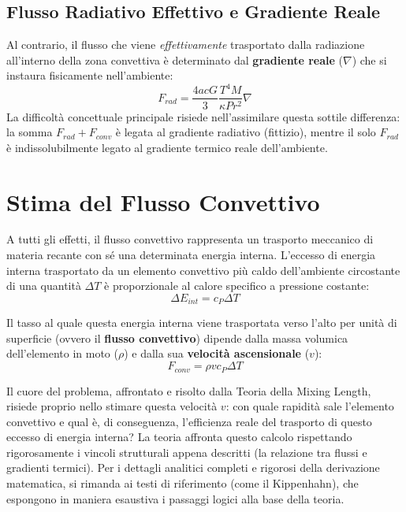 \subsection{Flusso Radiativo Effettivo e Gradiente Reale}

Al contrario, il flusso che viene \textit{effettivamente} trasportato dalla radiazione all'interno della zona convettiva è determinato dal \textbf{gradiente reale} ($\nabla$) che si instaura fisicamente nell'ambiente:
\begin{equation}
F_{rad} = \frac{4 a c G}{3} \frac{T^4 M}{\kappa P r^2} \nabla
\end{equation}
La difficoltà concettuale principale risiede nell'assimilare questa sottile differenza: la somma $F_{rad} + F_{conv}$ è legata al gradiente radiativo (fittizio), mentre il solo $F_{rad}$ è indissolubilmente legato al gradiente termico reale dell'ambiente.

\section{Stima del Flusso Convettivo}

A tutti gli effetti, il flusso convettivo rappresenta un trasporto meccanico di materia recante con sé una determinata energia interna.
L'eccesso di energia interna trasportato da un elemento convettivo più caldo dell'ambiente circostante di una quantità $\Delta T$ è proporzionale al calore specifico a pressione costante:
\begin{equation}
\Delta E_{int} = c_P \Delta T
\end{equation}

Il tasso al quale questa energia interna viene trasportata verso l'alto per unità di superficie (ovvero il \textbf{flusso convettivo}) dipende dalla massa volumica dell'elemento in moto ($\rho$) e dalla sua \textbf{velocità ascensionale} ($v$):
\begin{equation}
F_{conv} = \rho v c_P \Delta T
\end{equation}

Il cuore del problema, affrontato e risolto dalla Teoria della Mixing Length, risiede proprio nello stimare questa velocità $v$: con quale rapidità sale l'elemento convettivo e qual è, di conseguenza, l'efficienza reale del trasporto di questo eccesso di energia interna?
La teoria affronta questo calcolo rispettando rigorosamente i vincoli strutturali appena descritti (la relazione tra flussi e gradienti termici). Per i dettagli analitici completi e rigorosi della derivazione matematica, si rimanda ai testi di riferimento (come il Kippenhahn), che espongono in maniera esaustiva i passaggi logici alla base della teoria.